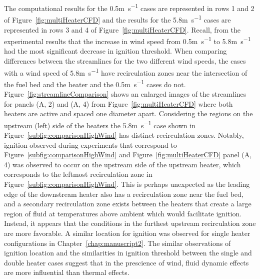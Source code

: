     The computational results for the 0.5\si{\meter\per\second} cases are represented in rows 1 and 2 of Figure~\ref{fig:multiHeaterCFD} and the results for the 5.8\si{\meter\per\second} cases are represented in rows 3 and 4 of Figure~\ref{fig:multiHeaterCFD}. Recall, from the experimental results that the increase in wind speed from 0.5\si{\meter\per\second} to 5.8\si{\meter\per\second} had the most significant decrease in ignition threshold. When comparing differences between the streamlines for the two different wind speeds, the cases with a wind speed of 5.8\si{\meter\per\second} have recirculation zones near the intersection of the fuel bed and the heater and the 0.5\si{\meter\per\second} cases do not. Figure~\ref{fig:streamlineComparison} shows an enlarged images of the streamlines for panels (A, 2) and (A, 4) from Figure~\ref{fig:multiHeaterCFD} where both heaters are active and spaced one diameter apart. Considering the regions on the upstream (left) side of the heaters the 5.8\si{\meter\per\second} case shown in Figure~\ref{subfig:comparisonHighWind} has distinct recirculation zones. Notably, ignition observed during experiments that correspond to Figure~\ref{subfig:comparisonHighWind} and Figure~\ref{fig:multiHeaterCFD} panel (A, 4) was observed to occur on the upstream side of the upstream heater, which corresponds to the leftmost recirculation zone in Figure~\ref{subfig:comparisonHighWind}. This is perhaps unexpected as the leading edge of the downstream heater also has a recirculation zone near the fuel bed, and a secondary recirculation zone exists between the heaters that create a large region of fluid at temperatures above ambient which would facilitate ignition. Instead, it appears that the conditions in the furthest upstream recirculation zone are more favorable. A similar location for ignition was observed for single heater configurations in Chapter~\ref{chap:manuscript2}. The similar observations of ignition location and the similarities in ignition threshold between the single and double heater cases suggest that in the prescience of wind, fluid dynamic effects are more influential than thermal effects.
